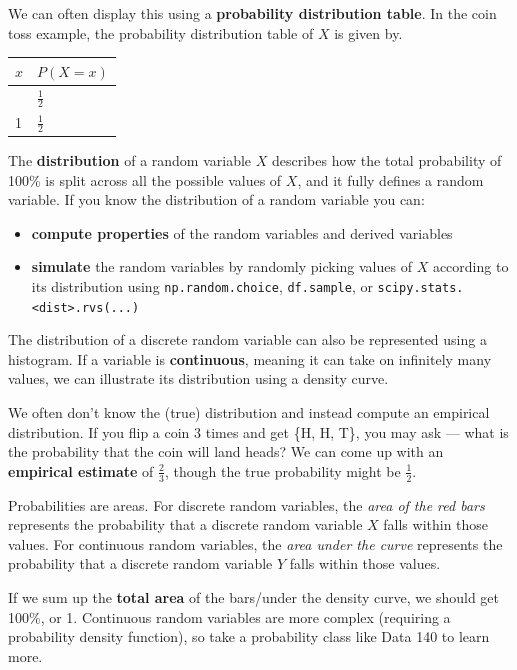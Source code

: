 \documentclass[
  letterpaper,
  DIV=11,
  numbers=noendperiod]{scrreprt}
\providecommand{\tightlist}{%
  \setlength{\itemsep}{0pt}\setlength{\parskip}{0pt}}\usepackage{longtable,booktabs,array}
\begin{document}
We can often display this using a \textbf{probability distribution
table}. In the coin toss example, the probability distribution table of
\(X\) is given by.

\begin{longtable}[]{@{}ll@{}}
\toprule\noalign{}
\(x\) & \(P(X=x)\) \\
\midrule\noalign{}
\endhead
\bottomrule\noalign{}
\endlastfoot
0 & \(\frac{1}{2}\) \\
1 & \(\frac{1}{2}\) \\
\end{longtable}

The \textbf{distribution} of a random variable \(X\) describes how the
total probability of 100\% is split across all the possible values of
\(X\), and it fully defines a random variable. If you know the
distribution of a random variable you can:

\begin{itemize}
\tightlist
\item
  \textbf{compute properties} of the random variables and derived
  variables
\item
  \textbf{simulate} the random variables by randomly picking values of
  \(X\) according to its distribution using \texttt{np.random.choice},
  \texttt{df.sample}, or
  \texttt{scipy.stats.\textless{}dist\textgreater{}.rvs(...)}
\end{itemize}

The distribution of a discrete random variable can also be represented
using a histogram. If a variable is \textbf{continuous}, meaning it can
take on infinitely many values, we can illustrate its distribution using
a density curve.

We often don't know the (true) distribution and instead compute an
empirical distribution. If you flip a coin 3 times and get \{H, H, T\},
you may ask --- what is the probability that the coin will land heads?
We can come up with an \textbf{empirical estimate} of \(\frac{2}{3}\),
though the true probability might be \(\frac{1}{2}\).

Probabilities are areas. For discrete random variables, the \emph{area
of the red bars} represents the probability that a discrete random
variable \(X\) falls within those values. For continuous random
variables, the \emph{area under the curve} represents the probability
that a discrete random variable \(Y\) falls within those values.

If we sum up the \textbf{total area} of the bars/under the density
curve, we should get 100\%, or 1. Continuous random variables are more
complex (requiring a probability density function), so take a
probability class like Data 140 to learn more.
\end{document}
